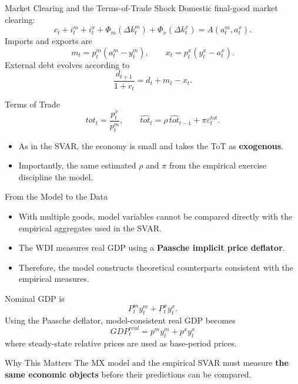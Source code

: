 \documentclass[10pt]{beamer}
\begin{document}
\begin{frame}{Market Clearing and the Terms-of-Trade Shock}
\small
Domestic final-good market clearing:
\[
c_t+i_t^m+i_t^x
+\Phi_m(\Delta k_t^m)
+\Phi_x(\Delta k_t^x)
=
A(a_t^m,a_t^x).
\]
Imports and exports are
\[
m_t=p_t^m(a_t^m-y_t^m),
\qquad
x_t=p_t^x(y_t^x-a_t^x).
\]
External debt evolves according to
\[
\frac{d_{t+1}}{1+r_t}
=
d_t+m_t-x_t.
\]
\vspace{0.1cm}
\begin{block}{Terms of Trade}
\[
tot_t=\frac{p_t^x}{p_t^m},
\qquad
\widehat{tot}_t
=
\rho\,\widehat{tot}_{t-1}
+
\pi\varepsilon_t^{tot}.
\]
\end{block}
\begin{itemize}
    \item As in the SVAR, the economy is small and takes the ToT as
    \textbf{exogenous}.
    \item Importantly, the same estimated $\rho$ and $\pi$ from the empirical
    exercise discipline the model.
\end{itemize}
\end{frame}

\begin{frame}{From the Model to the Data}
\small
\begin{itemize}
    \item With multiple goods, model variables cannot be compared directly
    with the empirical aggregates used in the SVAR.
    \item The WDI measures real GDP using a
    \textbf{Paasche implicit price deflator}.
    \item Therefore, the model constructs theoretical counterparts
    consistent with the empirical measures.
\end{itemize}
\vspace{0.15cm}
Nominal GDP is
\[
P_t^m y_t^m + P_t^x y_t^x.
\]
Using the Paasche deflator, model-consistent real GDP becomes
\[
\boxed{
GDP_t^{real}
=
p^m y_t^m+p^x y_t^x
}
\]
where steady-state relative prices are used as base-period prices.
\vspace{0.15cm}
\begin{block}{Why This Matters}
\centering
The MX model and the empirical SVAR must measure
\textbf{the same economic objects} before their predictions can be compared.
\end{block}
\end{frame}
\end{document}
